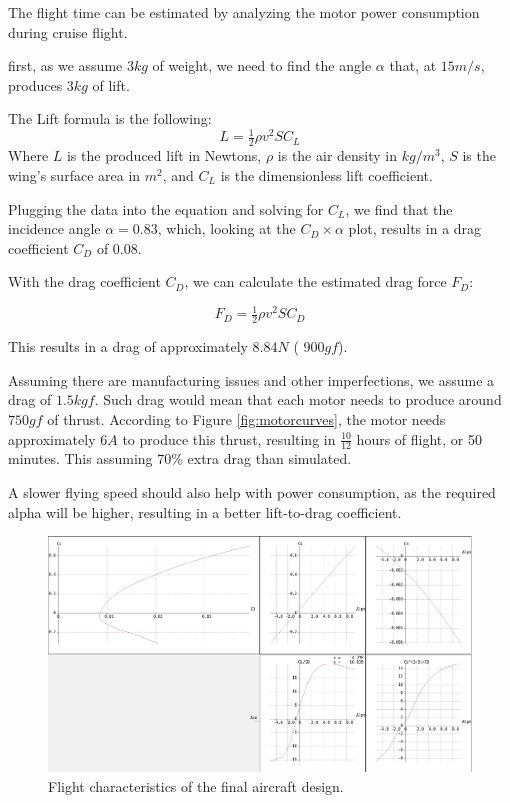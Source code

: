 The flight time can be estimated by analyzing the motor power consumption during cruise flight.

first, as we assume $ 3 kg $ of weight, we need to find the angle $\alpha$ that, at $15 m/s$, produces $3kg$ of lift.

The Lift formula is the following:
\begin{equation}
L=\tfrac{1}{2}\rho v^{2}SC_{L}
\end{equation}
Where $L$ is the produced lift in Newtons, $\rho$ is the air density in $kg/m^3$, $S$ is the wing's surface area in $m^2$, and $C_L$ is the dimensionless lift coefficient.

Plugging the data into the equation and solving for $C_L$, we find that the incidence angle $\alpha = 0.83$, which, looking at the $C_D \times \alpha$ plot, results in a drag coefficient $C_D$ of 0.08.

With the drag coefficient $C_D$, we can calculate the estimated drag force $F_D$:

\begin{equation}
F_{D}=\tfrac{1}{2}\rho v^{2} S C_{D}
\end{equation}

This results in a drag of approximately $8.84N$ ( $900 gf$).

Assuming there are manufacturing issues and other imperfections, we assume a drag of $1.5 kgf$. Such drag would mean that each motor needs to produce around $ 750 gf$ of thrust. According to Figure \ref{fig:motorcurves}, the motor needs 
approximately $6 A$ to produce this thrust, resulting in $\frac{10}{12}$ hours of flight, or 50 minutes. This assuming 70\% extra drag than simulated.

A slower flying speed should also help with power consumption, as the required alpha will be higher, resulting in a better lift-to-drag coefficient.



\begin{figure}
\centering
  \includegraphics[width=\linewidth]{figs/craftpolar2.png}
  \caption{Flight characteristics of the final aircraft design.}
  \label{fig:craftpolar}
\end{figure}


